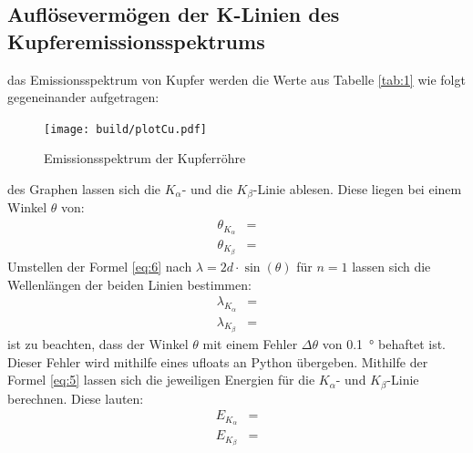 \subsection{Auflösevermögen der K-Linien des Kupferemissionsspektrums}

    \justifying das Emissionsspektrum von Kupfer werden die Werte aus Tabelle \ref{tab:1} wie folgt gegeneinander aufgetragen:

    \begin{figure}[H]
        \centering
        \texttt{[image: build/plotCu.pdf]}
        \caption{Emissionsspektrum der Kupferröhre}
        \label{fig:3}
    \end{figure}

    \justifying des Graphen lassen sich die $K_{\alpha}$- und die $K_{\beta}$-Linie ablesen. Diese liegen bei einem
    Winkel $\theta$ von:
    \begin{subequations}\label{eq:11}
    \begin{align}
        \theta_{K_{\alpha}} &= \text{} \label{eq:11a}\\
        \theta_{K_{\beta}} &= \text{} \label{eq:11b}
    \end{align}
    \end{subequations}
    \justifying Umstellen der Formel \eqref{eq:6} nach $\lambda = 2d\cdot\sin(\theta)$ für $n=1$ lassen sich die Wellenlängen 
    der beiden Linien bestimmen: 
    \begin{subequations}\label{eq:12}
    \begin{align}
        \lambda_{K_{\alpha}} &= \text{} \label{eq:12a}\\
        \lambda_{K_{\beta}} &= \text{} \label{eq:12b}
    \end{align}
    \end{subequations}
    \justifying ist zu beachten, dass der Winkel $\theta$ mit einem Fehler $\Delta \theta$ von \SI{0.1}{\degree} behaftet ist.
    Dieser Fehler wird mithilfe eines ufloats \cite{uncertainties} an Python übergeben. 
    Mithilfe der Formel \eqref{eq:5} lassen sich die jeweiligen Energien für die $K_{\alpha}$- und $K_{\beta}$-Linie
    berechnen. Diese lauten:
    \begin{subequations}\label{eq:13}
    \begin{align}
        E_{K_{\alpha}} &= \text{} \label{eq:13a}\\
        E_{K_{\beta}} &= \text{} \label{eq:13b}
    \end{align}
    \end{subequations}
